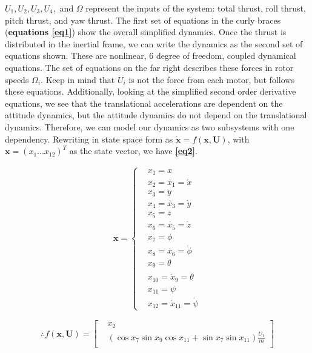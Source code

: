 \documentclass[conf]{new-aiaa}
\begin{document}
\begin{doublespace}
$U_1, U_2, U_3, U_4,$ and $\Omega$ represent the inputs of the system: total thrust, roll thrust, pitch thrust, and yaw thrust. The first set of equations in the curly braces (\textbf{equations \ref{eq1}}) show the overall simplified dynamics. Once the  thrust is distributed in the inertial frame, we can write the dynamics as the second set of equations shown. These are nonlinear, 6 degree of freedom, coupled dynamical equations. The set of equations on the far right describes these forces in rotor speeds $\Omega_i$. Keep in mind that $U_i$ is not the force from each motor, but follows these equations. Additionally, looking at the simplified second order derivative equations, we see that the translational accelerations are dependent on the attitude dynamics, but the attitude dynamics do not depend on the translational dynamics. Therefore, we can model our dynamics as two subsystems with one dependency. Rewriting in state space form as $\dot{\mathbf{x}}= f(\mathbf{x},\mathbf{U})$, with $\pmb{x}= (x_1 ... x_{12})^T$ as the state vector, we have \textbf{\ref{eq2}}. 
\begin{singlespace}
\begin{figure} 
	\begin{minipage}{0.3\textwidth}
		\begin{align*}
		\pmb{x}=
			\begin{cases}
				& x_1 = x \\
				& x_2 = \dot{x_1} = \dot{x} \\
				& x_3 = y \\
				& x_4 = \dot{x_3} = \dot{y}\\
				& x_5 = z \\
				& x_6 = \dot{x_5} = \dot{z}\\
				& x_7 = \phi \\
				& x_8 = \dot{x_6} = \dot{\phi}\\
				& x_9 = \theta \\
				& x_{10} = \dot{x}_9 = \dot{\theta}\\
				& x_{11} = \psi \\
				& x_{12} = \dot{x}_{11} = \dot{\psi}
			\end{cases}
		\end{align*}
	\end{minipage}
  \begin{minipage}{.4\textwidth}
  	\[
	\therefore f(\pmb{x},\pmb{U}) =
	\begin{bmatrix}
		& x_2 \\
        &(\cos x_7\sin x_9\cos x_11 + \sin x_7\sin x_11)\frac{U_1}{m} \\

\end{bmatrix}\]
\end{minipage}
\end{figure}
\end{singlespace}
\end{doublespace}
\end{document}
